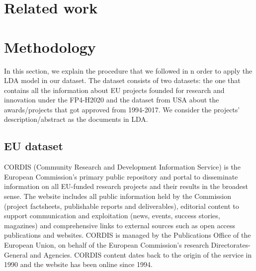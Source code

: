 \documentclass[12pt]{report}
\begin{document}
\section{Related work}

\section{Methodology}

In this section, we explain the procedure that we followed in n order to apply the LDA model in our dataset. The dataset consists of two datasets: the one that contains all the information about EU projects founded for research and innovation under the FP4-H2020 and the dataset from USA about the awards/projects that got approved from 1994-2017. We consider the projects' description/abstract as the documents in LDA.
 

\subsection{EU dataset}

CORDIS (Community Research and Development Information Service) is the European Commission's primary public repository and portal to disseminate information on all EU-funded research projects and their results in the broadest sense. The website includes all public information held by the Commission (project factsheets, publishable reports and deliverables), editorial content to support communication and exploitation (news, events, success stories, magazines) and comprehensive links to external sources such as open access publications and websites. CORDIS is managed by the Publications Office of the European Union, on behalf of the European Commission's research Directorates-General and Agencies. CORDIS content dates back to the origin of the service in 1990 and the website has been online since 1994.
\end{document}
